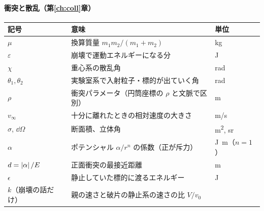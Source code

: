 \noindent\begin{minipage}{\linewidth}
\paragraph{衝突と散乱（第\ref{ch:coll}章）}\mbox{}\par\smallskip
\begin{center}
\begin{tabularx}{\linewidth}{@{}lLl@{}}
\toprule
記号 & 意味 & 単位 \\
\midrule
$\mu$ & 換算質量 $m_1m_2/(m_1+m_2)$ & \unit{kg} \\
$\varepsilon$ & 崩壊で運動エネルギーになる分 & \unit{J} \\
$\chi$ & 重心系の散乱角 & \unit{rad} \\
$\theta_1,\theta_2$ & 実験室系で入射粒子・標的が出ていく角 & \unit{rad} \\
$\rho$ & 衝突パラメータ（円筒座標の $\rho$ と文脈で区別） & \unit{m} \\
$v_\infty$ & 十分に離れたときの相対速度の大きさ & \unit{m/s} \\
$\sigma$, $\dd\Omega$ & 断面積、立体角 & \unit{m^2}, \unit{sr} \\
$\alpha$ & ポテンシャル $\alpha/r^n$ の係数（正が斥力） & \unit{J.m}（$n=1$） \\
$d=\left\lvert \alpha\right\rvert/E$ & 正面衝突の最接近距離 & \unit{m} \\
$\epsilon$ & 静止していた標的に渡るエネルギー & \unit{J} \\
$k$（崩壊の話だけ） & 親の速さと破片の静止系の速さの比 $V/v_0$ & \\
\bottomrule
\end{tabularx}
\end{center}
\end{minipage}
